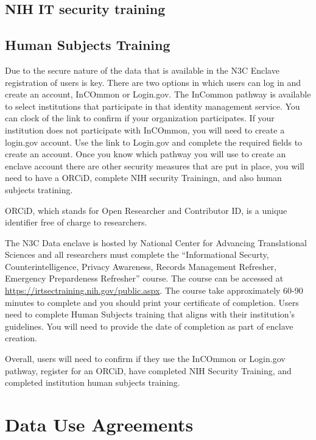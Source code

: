 \documentclass[
  letterpaper,
  DIV=11,
  numbers=noendperiod]{scrreprt}
\begin{document}
\hypertarget{nih-it-security-training}{%
\subsection{NIH IT security training}\label{nih-it-security-training}}

\hypertarget{human-subjects-training}{%
\subsection{Human Subjects Training}\label{human-subjects-training}}

Due to the secure nature of the data that is available in the N3C
Enclave registration of users is key. There are two options in which
users can log in and create an account, InCOmmon or Login.gov. The
InCommon pathway is available to select institutions that participate in
that identity management service. You can clock of the link to confirm
if your organization participates. If your institution does not
participate with InCOmmon, you will need to create a login.gov account.
Use the link to Login.gov and complete the required fields to create an
account. Once you know which pathway you will use to create an enclave
account there are other security measures that are put in place, you
will need to have a ORCiD, complete NIH security Trainingn, and also
human subjects tratining.

ORCiD, which stands for Open Researcher and Contributor ID, is a unique
identifier free of charge to researchers.

The N3C Data enclave is hosted by National Center for Advancing
Translational Sciences and all researchers must complete the
``Informational Securty, Counterintelligence, Privacy Awareness, Records
Management Refresher, Emergency Prepardeness Refresher'' course. The
course can be accessed at
\url{https://irtsectraining.nih.gov/public.aspx}. The course take
approximately 60-90 minutes to complete and you should print your
certificate of completion. Users need to complete Human Subjects
training that aligns with their institution's guidelines. You will need
to provide the date of completion as part of enclave creation.

Overall, users will need to confirm if they use the InCOmmon or
Login.gov pathway, register for an ORCiD, have completed NIH Security
Training, and completed institution human subjects training.

\hypertarget{data-use-agreements}{%
\section{Data Use Agreements}\label{data-use-agreements}}
\end{document}
